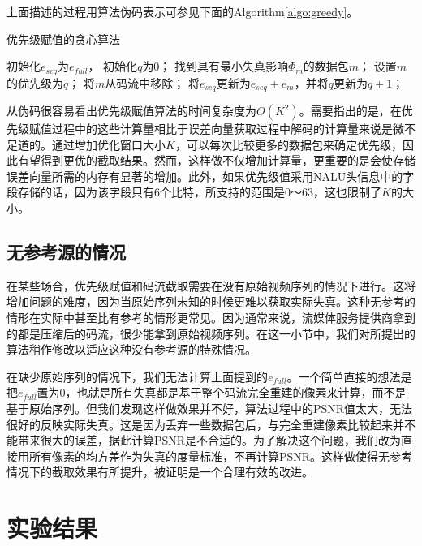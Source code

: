 上面描述的过程用算法伪码表示可参见下面的Algorithm\ref{algo:greedy}。

\begin{algorithm}
	\caption{优先级赋值的贪心算法}
	\label{algo:greedy}
	\begin{algorithmic}
		\STATE 初始化$e_{seq}$为$e_{full}$， 初始化$q$为0；
		\STATE 找到具有最小失真影响$\Phi_m$的数据包$m$；
		\ENDFOR
		\STATE 设置$m$的优先级为$q$；
		\STATE 将$m$从码流中移除；
		\STATE 将$e_{seq}$更新为$e_{seq} + e_m$，并将$q$更新为$q+1$；
		\ENDWHILE
	\end{algorithmic}
\end{algorithm}

从伪码很容易看出优先级赋值算法的时间复杂度为$O(K^2)$。需要指出的是，在优先级赋值过程中的这些计算量相比于误差向量获取过程中解码的计算量来说是微不足道的。通过增加优化窗口大小$K$，可以每次比较更多的数据包来确定优先级，因此有望得到更优的截取结果。然而，这样做不仅增加计算量，更重要的是会使存储误差向量所需的内存有显著的增加。此外，如果优先级值采用NALU头信息中的字段存储的话，因为该字段只有6个比特，所支持的范围是0～63，这也限制了$K$的大小。

\subsection{无参考源的情况}

在某些场合，优先级赋值和码流截取需要在没有原始视频序列的情况下进行。这将增加问题的难度，因为当原始序列未知的时候更难以获取实际失真。这种无参考的情形在实际中甚至比有参考的情形更常见。因为通常来说，流媒体服务提供商拿到的都是压缩后的码流，很少能拿到原始视频序列。在这一小节中，我们对所提出的算法稍作修改以适应这种没有参考源的特殊情况。

在缺少原始序列的情况下，我们无法计算上面提到的$e_{full}$。一个简单直接的想法是把$e_{full}$置为0，也就是所有失真都是基于整个码流完全重建的像素来计算，而不是基于原始序列。但我们发现这样做效果并不好，算法过程中的PSNR值太大，无法很好的反映实际失真。这是因为丢弃一些数据包后，与完全重建像素比较起来并不能带来很大的误差，据此计算PSNR是不合适的。为了解决这个问题，我们改为直接用所有像素的均方差作为失真的度量标准，不再计算PSNR。这样做使得无参考情况下的截取效果有所提升，被证明是一个合理有效的改进。

\section{实验结果}

